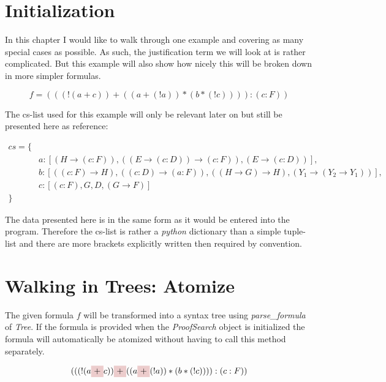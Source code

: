 \section{Initialization}
In this chapter I would like to walk through one example and covering as many special cases as possible. As such, the justification term we will look at is rather complicated. But this example will also show how nicely this will be broken down in more simpler formulas.

\begin{equation}\label{eq:f}
f = (((!(a+c))+((a+(!a))*(b*(!c)))):(c:F))
\end{equation}


The cs-list used for this example will only be relevant later on but still be presented here as reference:


\begin{equation}\label{cs}
\begin{split}
	cs = \{\\
	& a: [(H \rightarrow (c:F)), ((E \rightarrow (c:D)) \rightarrow (c:F)), (E \rightarrow (c:D))],\\
	& b: [((c:F) \rightarrow H), ((c:D) \rightarrow (a:F)), ((H \rightarrow G) \rightarrow H), (Y_1 \rightarrow (Y_2 \rightarrow Y_1))],\\
	& c: [(c:F), G, D, (G \rightarrow F)] \\
	\}
\end{split}
\end{equation}

The data presented here is in the same form as it would be entered into the program. Therefore the cs-list is rather a \emph{python} dictionary than a simple tuple-list and there are more brackets explicitly written then required by convention.


\section{Walking in Trees: Atomize}

The given formula $f$ will be transformed into a syntax tree using \emph{parse\_formula} of \emph{Tree}. If the formula is provided when the \emph{ProofSearch} object is initialized the formula will automatically be atomized without having to call this method separately.

\begin{equation*}
	(((!(a
    \tikz[baseline]{\node[fill=red!20,anchor=base] (t1){$+$};} c))
    \tikz[baseline]{\node[fill=red!20,anchor=base] (t2){$+$};} ((a
    \tikz[baseline]{\node[fill=red!20,anchor=base] (t3){$+$};} (!a))*(b*(!c)))):(c:F))
\end{equation*}

